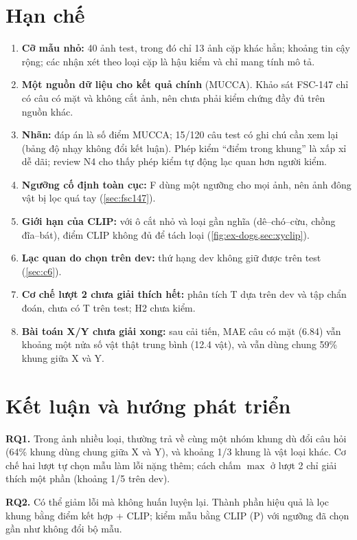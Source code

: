 \documentclass[12pt,a4paper]{article}
\begin{document}
\section{Hạn chế}\label{sec:limits}
\begin{enumerate}
\item \textbf{Cỡ mẫu nhỏ:} 40 ảnh test, trong đó chỉ 13 ảnh cặp khác hẳn; khoảng tin cậy rộng; các nhận xét theo loại cặp là hậu kiểm và chỉ mang tính mô tả.
\item \textbf{Một nguồn dữ liệu cho kết quả chính} (MUCCA). Khảo sát FSC-147 chỉ có câu có mặt và không cắt ảnh, nên chưa phải kiểm chứng đầy đủ trên nguồn khác.
\item \textbf{Nhãn:} đáp án là số điểm MUCCA; 15/120 câu test có ghi chú cần xem lại (bảng độ nhạy không đổi kết luận). Phép kiểm ``điểm trong khung'' là xấp xỉ dễ dãi; review N4 cho thấy phép kiểm tự động lạc quan hơn người kiểm.
\item \textbf{Ngưỡng cố định toàn cục:} F dùng một ngưỡng cho mọi ảnh, nên ảnh đông vật bị lọc quá tay (\cref{sec:fsc147}).
\item \textbf{Giới hạn của CLIP:} với ô cắt nhỏ và loại gần nghĩa (dê--chó--cừu, chồng đĩa--bát), điểm CLIP không đủ để tách loại (\cref{fig:ex-dogs,sec:xyclip}).
\item \textbf{Lạc quan do chọn trên dev:} thứ hạng dev không giữ được trên test (\cref{sec:c6}).
\item \textbf{Cơ chế lượt 2 chưa giải thích hết:} phân tích T dựa trên dev và tập chẩn đoán, chưa có T trên test; H2 chưa kiểm.
\item \textbf{Bài toán X/Y chưa giải xong:} sau cải tiến, MAE câu có mặt (6.84) vẫn khoảng một nửa số vật thật trung bình (12.4 vật), và \PF{} vẫn dùng chung 59\% khung giữa X và Y.
\end{enumerate}

\section{Kết luận và hướng phát triển}\label{sec:conclusion}
\textbf{RQ1.} Trong ảnh nhiều loại, \cgdpp{} thường trả về cùng một nhóm khung dù đổi câu hỏi (64\% khung dùng chung giữa X và Y), và khoảng 1/3 khung là vật loại khác. Cơ chế hai lượt tự chọn mẫu làm lỗi nặng thêm; cách chấm $\max$ ở lượt 2 chỉ giải thích một phần (khoảng 1/5 trên dev).

\textbf{RQ2.} Có thể giảm lỗi mà không huấn luyện lại. Thành phần hiệu quả là lọc khung bằng điểm kết hợp \cgdpp{} + CLIP; kiểm mẫu bằng CLIP (P) với ngưỡng đã chọn gần như không đổi bộ mẫu.
\end{document}
